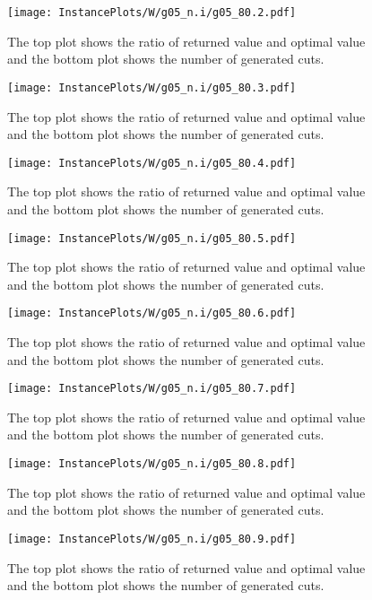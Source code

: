 \documentclass[10pt,a4paper]{article}
\begin{document}
\begin{figure}[H]
\texttt{[image: InstancePlots/W/g05\_n.i/g05\_80.2.pdf]}
\caption{The top plot shows the ratio of returned value and optimal value     and the bottom plot shows the number of generated cuts.}
\end{figure}

\begin{figure}[H]
\texttt{[image: InstancePlots/W/g05\_n.i/g05\_80.3.pdf]}
\caption{The top plot shows the ratio of returned value and optimal value     and the bottom plot shows the number of generated cuts.}
\end{figure}

\begin{figure}[H]
\texttt{[image: InstancePlots/W/g05\_n.i/g05\_80.4.pdf]}
\caption{The top plot shows the ratio of returned value and optimal value     and the bottom plot shows the number of generated cuts.}
\end{figure}

\begin{figure}[H]
\texttt{[image: InstancePlots/W/g05\_n.i/g05\_80.5.pdf]}
\caption{The top plot shows the ratio of returned value and optimal value     and the bottom plot shows the number of generated cuts.}
\end{figure}

\begin{figure}[H]
\texttt{[image: InstancePlots/W/g05\_n.i/g05\_80.6.pdf]}
\caption{The top plot shows the ratio of returned value and optimal value     and the bottom plot shows the number of generated cuts.}
\end{figure}

\begin{figure}[H]
\texttt{[image: InstancePlots/W/g05\_n.i/g05\_80.7.pdf]}
\caption{The top plot shows the ratio of returned value and optimal value     and the bottom plot shows the number of generated cuts.}
\end{figure}

\begin{figure}[H]
\texttt{[image: InstancePlots/W/g05\_n.i/g05\_80.8.pdf]}
\caption{The top plot shows the ratio of returned value and optimal value     and the bottom plot shows the number of generated cuts.}
\end{figure}

\begin{figure}[H]
\texttt{[image: InstancePlots/W/g05\_n.i/g05\_80.9.pdf]}
\caption{The top plot shows the ratio of returned value and optimal value     and the bottom plot shows the number of generated cuts.}
\end{figure}
\end{document}
